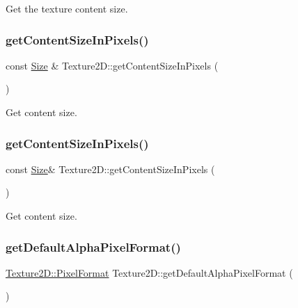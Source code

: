 Get the texture content size. \mbox{\label{classTexture2D_ac158f36e8cd5a584e8a76f67abad563d}} 
\subsubsection{\texorpdfstring{get\+Content\+Size\+In\+Pixels()}{getContentSizeInPixels()}\hspace{0.1cm}{\footnotesize\ttfamily [1/2]}}
{\footnotesize\ttfamily const \hyperlink{classSize}{Size} \& Texture2\+D\+::get\+Content\+Size\+In\+Pixels (\begin{DoxyParamCaption}{ }\end{DoxyParamCaption})}

Get content size. \mbox{\label{classTexture2D_a827e7f2d58de577a63e62d3ed4f488cd}} 
\subsubsection{\texorpdfstring{get\+Content\+Size\+In\+Pixels()}{getContentSizeInPixels()}\hspace{0.1cm}{\footnotesize\ttfamily [2/2]}}
{\footnotesize\ttfamily const \hyperlink{classSize}{Size}\& Texture2\+D\+::get\+Content\+Size\+In\+Pixels (\begin{DoxyParamCaption}{ }\end{DoxyParamCaption})}

Get content size. \mbox{\label{classTexture2D_ab08c2f098f96cc9549fd583177ac9971}} 
\subsubsection{\texorpdfstring{get\+Default\+Alpha\+Pixel\+Format()}{getDefaultAlphaPixelFormat()}\hspace{0.1cm}{\footnotesize\ttfamily [1/2]}}
{\footnotesize\ttfamily \hyperlink{classTexture2D_a45d9d8bb5a0669def36bbdfbfb91d220}{Texture2\+D\+::\+Pixel\+Format} Texture2\+D\+::get\+Default\+Alpha\+Pixel\+Format (\begin{DoxyParamCaption}{ }\end{DoxyParamCaption})\hspace{0.3cm}{\ttfamily [static]}}


